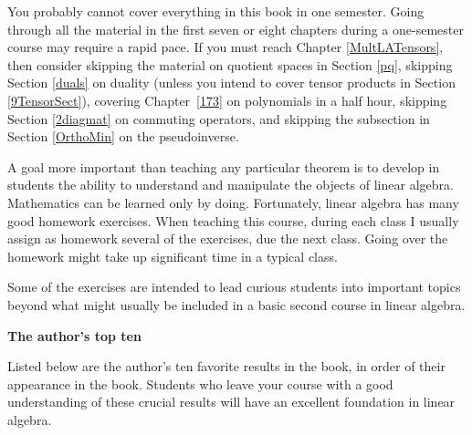 You probably cannot cover everything in this book in one semester.  Going through all the material in the first seven or eight chapters during a one-semester course may require a rapid pace.  If you must reach Chapter \ref{MultLATensors},
then consider skipping the material on quotient spaces in Section \ref{pq}, skipping Section \ref{duals} on duality (unless you intend to cover tensor products in Section \ref{9TensorSect}), covering Chapter~\ref{173} on polynomials in a half hour, skipping Section \ref{2diagmat} on commuting operators, and skipping the subsection in Section \ref{OrthoMin} on the pseudoinverse.

A goal more important than teaching any particular theorem is to develop
in students the ability to understand  and manipulate the objects of linear
algebra.   Mathematics can  be learned only by doing. Fortunately, linear
algebra has many good homework exercises.  When teaching this course, during each class I
usually  assign as homework several of the exercises, due the next
class. Going over the homework might take up significant time in a typical class.

Some of the exercises are intended to lead curious students into important topics beyond what might usually be included in a basic second course in linear algebra.

\bigskip

\textbf{The author's top ten}

\medskip

\noindent
Listed below are the author's ten favorite results in the book, in order of their appearance in the book. Students who leave your course with a good understanding of these crucial results will have an excellent foundation in linear algebra.

